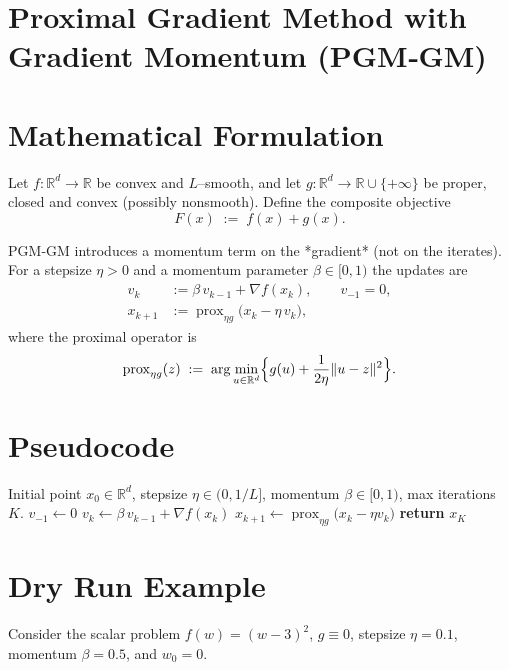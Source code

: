 \documentclass{article}
\newcommand{\prox}{\operatorname{prox}}
\begin{document}
\section*{Proximal Gradient Method with Gradient Momentum (PGM‑GM)}

\section*{Mathematical Formulation}
Let $f:\mathbb{R}^{d}\rightarrow\mathbb{R}$ be convex and $L$–smooth, and let $g:\mathbb{R}^{d}\rightarrow\mathbb{R}\cup\{+\infty\}$ be proper, closed and convex (possibly nonsmooth). Define the composite objective
\[
F(x)\;:=\;f(x)+g(x).
\]

PGM‑GM introduces a momentum term on the *gradient* (not on the iterates). For a stepsize $\eta>0$ and a momentum parameter $\beta\in[0,1)$ the updates are
\[
\boxed{
\begin{aligned}
v_{k}      &:= \beta\,v_{k-1} + \nabla f(x_{k}), \qquad v_{-1}=0,\\[4pt]
x_{k+1}    &:= \prox_{\eta g}\!\bigl(x_{k}-\eta\,v_{k}\bigr),
\end{aligned}}
\tag{1}
\]
where the proximal operator is
\[
\prox_{\eta g}(z)\;:=\;\arg\min_{u\in\mathbb{R}^{d}}\Bigl\{ g(u)+\frac{1}{2\eta}\|u-z\|^{2}\Bigr\}.
\]

\section*{Pseudocode}
\begin{algorithm}[H]
\caption{Proximal Gradient Method with Gradient Momentum}
\begin{algorithmic}[1]
\Require Initial point $x_{0}\in\mathbb{R}^{d}$, stepsize $\eta\in(0,1/L]$, momentum $\beta\in[0,1)$, max iterations $K$.
\State $v_{-1}\gets 0$
    \State $v_{k}\gets \beta\,v_{k-1}+ \nabla f(x_{k})$ 
    \State $x_{k+1}\gets \prox_{\eta g}\bigl(x_{k}-\eta v_{k}\bigr)$
\EndFor
\State \textbf{return} $x_{K}$
\end{algorithmic}
\end{algorithm}

\section*{Dry Run Example}
Consider the scalar problem $f(w)=(w-3)^{2}$, $g\equiv0$, stepsize $\eta=0.1$, momentum $\beta=0.5$, and $w_{0}=0$.
\end{document}
